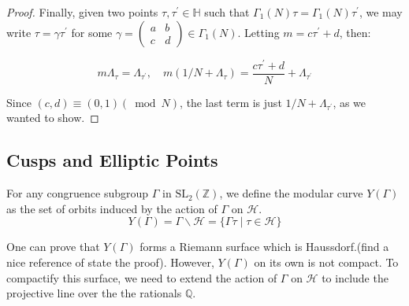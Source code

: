 \begin{proposition}
\begin{proof}
Finally, given two points $\tau, \tau^{\prime} \in \mathbb{H}$ such that $\Gamma_{1}(N) \tau=\Gamma_{1}(N) \tau^{\prime}$, we may write $\tau=\gamma \tau^{\prime}$ for some $\gamma=\left(\begin{array}{ll}a & b \\ c & d\end{array}\right) \in \Gamma_{1}(N)$. Letting $m=c \tau^{\prime}+d$, then:

$$
m \Lambda_{\tau}=\Lambda_{\tau^{\prime}}, \quad m\left(1 / N+\Lambda_{\tau}\right)=\frac{c \tau^{\prime}+d}{N}+\Lambda_{\tau^{\prime}}
$$

Since $(c, d) \equiv(0,1)(\bmod N)$, the last term is just $1 / N+\Lambda_{\tau^{\prime}}$, as we wanted to show.
\end{proof}
\end{proposition}
\subsection{Cusps and Elliptic Points}

\begin{definition}
    For any congruence subgroup $\Gamma$ in $\mathrm{SL}_{2}(\mathbb{Z})$, we define the modular curve $Y(\Gamma)$ as the set of orbits induced by the action of $\Gamma$ on $\mathcal{H}$.
    $$
Y(\Gamma)=\Gamma \backslash \mathcal{H}=\{\Gamma \tau \mid \tau \in \mathcal{H}\}
$$
\end{definition}
One can prove that $Y(\Gamma)$ forms a Riemann surface which is Haussdorf.(find a nice reference of state the proof).
However, $Y(\Gamma)$ on its own is not compact. To compactify this surface, we need to extend the action of $\Gamma$ on $\mathcal{H}$ to include the projective line over the the rationals $\mathbb{Q}$.

